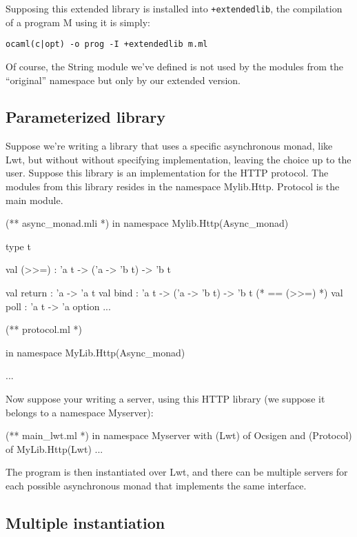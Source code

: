 \documentclass[11pt,a4paper]{article}
\begin{document}
Supposing this extended library is installed into \texttt{+extendedlib}, the
compilation of a program M using it is simply:
\begin{verbatim}
ocaml(c|opt) -o prog -I +extendedlib m.ml
\end{verbatim}

Of course, the String module we've defined is not used by the modules from the
``original'' namespace but only by our extended version.

\subsection{Parameterized library}

Suppose we're writing a library that uses a specific asynchronous monad, like
Lwt, but without without specifying implementation, leaving the choice up to the
user. Suppose this library is an implementation for the HTTP protocol. The modules
from this library resides in the namespace Mylib.Http. Protocol is the main module.

\begin{OCaml}
(** async_monad.mli *)
in namespace Mylib.Http(Async_monad)

type t

val (>>=) : 'a t -> ('a -> 'b t) -> 'b t

val return : 'a -> 'a t
val bind : 'a t -> ('a -> 'b t) -> 'b t (* == (>>=) *)
val poll : 'a t -> 'a option
...
\end{OCaml}

\medskip

\begin{OCaml}
(** protocol.ml *)

in namespace MyLib.Http(Async_monad)

...
\end{OCaml}

\medskip

Now suppose your writing a server, using this HTTP library (we suppose it belongs
to a namespace Myserver):

\begin{OCaml}
(** main_lwt.ml *)
in namespace Myserver
  with (Lwt) of Ocsigen
  and (Protocol) of MyLib.Http(Lwt)
...
\end{OCaml}

The program is then instantiated over Lwt, and there can be multiple servers for
each possible asynchronous monad that implements the same interface.

\subsection{Multiple instantiation}
\end{document}
